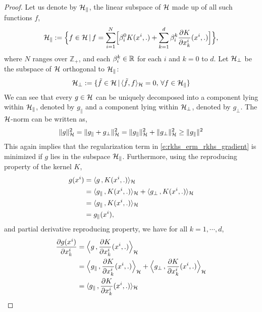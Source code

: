 \begin{proof}
Let us denote by ${\cal H}_\parallel$, the linear subspace of ${\cal H}$ made up of all such functions $f$,
	\[
	{\cal H}_\parallel := \Bigl\{f \in {\cal H}\, |\, f = \sum_{i=1}^N \Bigl[ \beta^0_i K(x^i,.) + \sum_{k=1}^d \beta_i^k \frac{\partial K }{\partial x^i_k} (x^i, .)\Bigr]\Bigr\},
	\]
	where $N$ ranges over $\mathbb{Z}_+$, and  each $\beta_i^k \in \mathbb{R}$ for each $i$ and $k = 0$ to $d$. Let ${\cal H}_{\perp}$ be the subspace of ${\cal H}$ orthogonal to ${\cal H}_\parallel$:
	\[
	{\cal H}_\perp : = \{ \tilde f \in {\cal H}\,| \, \langle \tilde f , f \rangle_{\cal H} = 0 ,\, \forall f \in {\cal H}_\parallel \}
	\]
	We can see that every $g \in {\cal H}$ can be uniquely decomposed into a component lying within ${\cal H}_\parallel$, denoted by $g_\parallel$ and a component lying within ${\cal H}_\perp$, denoted by $g_\perp$.
	The ${\cal H}$-norm can be written as,
	\begin{equation}
	\|g\|^2_\clH = \|g_\parallel + g_\perp\|^2_\clH = \|g_\parallel\|^2_\clH + \|g_\perp\|^2_\clH \geq \|g_\parallel\|^2
	\label{e:rkhs_g_reg}
	\end{equation}
	This again implies that the regularization term in \eqref{e:rkhs_erm_rkhs_gradient} is minimized if $g$ lies in the subspace ${\cal H}_\parallel$. Furthermore, using the reproducing property of the kernel $K$,
	\begin{equation}
	\begin{aligned}
	g(x^i) & =  \langle g \, , K(x^i,.) \rangle_\clH\\
	&  = \langle g_\parallel\, , K(x^i,.) \rangle_\clH + \langle g_\perp \, , K(x^i,.) \rangle_\clH \\
	&  = \langle g_\parallel\, , K(x^i,.) \rangle_\clH \\
	&  = g_\parallel(x^i),
	\end{aligned}
	\label{e:rkhs_g_parallel}
	\end{equation}
	and partial derivative reproducing property, we have for all $k = 1, \cdots, d$,
	\begin{equation}
	\begin{aligned}
	\frac{\partial g(x^i)}{\partial x^i_k} & = \Bigl \langle g \, , \frac{\partial K}{\partial x^i_k} (x^i,.) \Bigr \rangle_\clH\\
	&  = \Bigl \langle g_\parallel\, , \frac{\partial K}{\partial x^i_k} (x^i,.)  \Bigr \rangle_\clH + \Bigl \langle g_\perp \, ,\frac{\partial K}{\partial x^i_k} (x^i,.) \Bigr \rangle_\clH \\
	&  = \langle g_\parallel\, , \frac{\partial K}{\partial x^i_k} (x^i,.) \rangle_\clH \\

\end{aligned}
\end{equation}
\end{proof}
